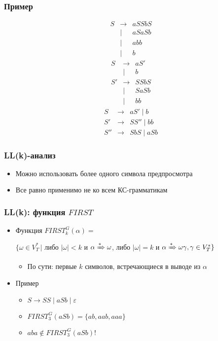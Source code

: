 \documentclass{beamer}
\newcommand{\derive}[0]{\xRightarrow[]{*}}
\begin{document}
\begin{frame}[fragile]
  \transwipe[direction=90]
  \frametitle{Пример}
  \[
  \begin{array}{crcl}
  &S& \to & a S S b S \\
  & &           | & a S a S b \\
  & &           | & a b b \\
  & &           | & b
  \end{array}
  \]
 \pause
  \[
  \begin{array}{crcl}
  &S & \to & a S' \\
  &  &           | & b \\

  &S'& \to & S S b S \\
  &  &           | & S a S b \\
  &  &           | & b b
  \end{array}
  \]
  \pause
  \[
  \begin{array}{crcl}
  &S  & \to & a S' \mid b \\

  &S' & \to & S S'' \mid b b \\

  &S''& \to & S b S \mid a S b
  \end{array}
  \]
\end{frame}


\begin{frame}[fragile]
  \transwipe[direction=90]
  \frametitle{LL(k)-анализ}

  \begin{itemize}
    \item Можно использовать более одного символа предпросмотра
    \item Все равно применимо не ко всем КС-грамматикам
  \end{itemize}

\end{frame}



\begin{frame}[fragile]
  \transwipe[direction=90]
  \frametitle{LL(k): функция $FIRST$}
  \begin{itemize}
      \item Функция $FIRST^G_k(\alpha) = $

      $\{ \omega \in V_T^* \, |$ либо $|\omega| < k$ и $ \alpha \derive \omega$, либо $|\omega| = k$ и $\alpha \derive \omega \gamma, \gamma \in V_T^*\}$
      \begin{itemize}
        \item По сути: первые $k$ символов, встречающиеся в выводе из $\alpha$
      \end{itemize}
      \item Пример
      \begin{itemize}
        \item $S \to S S \mid a S b \mid \varepsilon$
        \item $FIRST^G_3( a S b ) = \{ ab, aab, aaa\} $
        \item $aba \notin FIRST^G_3 (a S b)$!
      \end{itemize}
  \end{itemize}
\end{frame}
\end{document}
